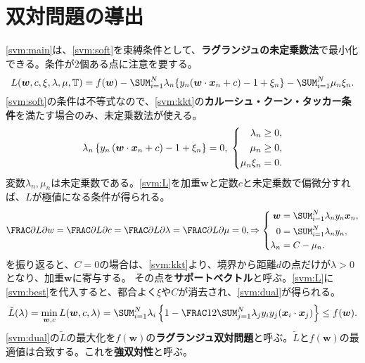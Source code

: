 \documentclass[10pt,a4paper]{book}
\begin{document}
\section{双対問題の導出}

\eqref{svm:main}は、\eqref{svm:soft}を束縛条件として、\textbf{ラグランジュの未定乗数法}で最小化できる。条件が2個ある点に注意を要する。
%
\begin{equation}
\label{eq:svm:L}
L(\bm{w},c,\xi,\lambda,\mu,\TRAIN) =
f(\bm{w}) - \sum_{i=1}^N \lambda_n \{y_n(\dprod{\bm{w}}{\bm{x}_n} + c) - 1 + \xi_n\} - \sum_{i=1}^N \mu_n \xi_n.
\end{equation}
%
\eqref{svm:soft}の条件は不等式なので、\eqref{svm:kkt}の\textbf{カルーシュ・クーン・タッカー条件}を満たす場合のみ、未定乗数法が使える。
%
\begin{equation}
\label{eq:svm:kkt}
\lambda_n \seq{y_n\tup{\dprod{\bm{w}}{\bm{x}_n} + c} - 1 + \xi_n} = 0,\esp
\left\{
\begin{aligned}
\lambda_n &\geq 0, \\
\mu_n     &\geq 0, \\
\mu_n\xi_n&=0.
\end{aligned}
\right.
\end{equation}
%
変数$\lambda_n,\mu_n$は未定乗数である。\eqref{svm:L}を加重$\bm{w}$と定数$c$と未定乗数で偏微分すれば、$L$が極値になる条件が得られる。
%
\begin{equation}
\label{eq:svm:best}
\pdiff{L}{w} = \pdiff{L}{c} = \pdiff{L}{\lambda} = \pdiff{L}{\mu} = 0,
\Rightarrow
\left\{
\begin{aligned}
\bm{w}    &= \sum_{i=1}^N \lambda_n y_n \bm{x}_n, \\
0         &= \sum_{i=1}^N \lambda_n y_n, \\
\lambda_n &= C - \mu_n.\\
\end{aligned}
\right.
\end{equation}
%
を振り返ると、$C=0$の場合は、\eqref{svm:kkt}より、境界から距離$d$の点だけが$\lambda>0$となり、加重$\bm{w}$に寄与する。
その点を\textbf{サポートベクトル}と呼ぶ。\eqref{svm:L}に\eqref{svm:best}を代入すると、都合よく$\xi$や$C$が消去され、\eqref{svm:dual}が得られる。
%
\begin{equation}
\label{eq:svm:dual}
\tilde{L}(\lambda) =
\min_{\bm{w},c} L(\bm{w},c, \lambda) =
\sum_{i=1}^N \lambda_i \seq{1 - \frac{1}{2} \sum_{j=1}^N \lambda_j y_i y_j (\dprod{\bm{x}_i}{\bm{x}_j})} \leq f(\bm{w}).
\end{equation}
%
\eqref{svm:dual}の$\tilde{L}$の最大化を$f(\bm{w})$の\textbf{ラグランジュ双対問題}と呼ぶ。$\tilde{L}$と$f(\bm{w})$の最適値は合致する。これを\textbf{強双対性}と呼ぶ。
\end{document}
